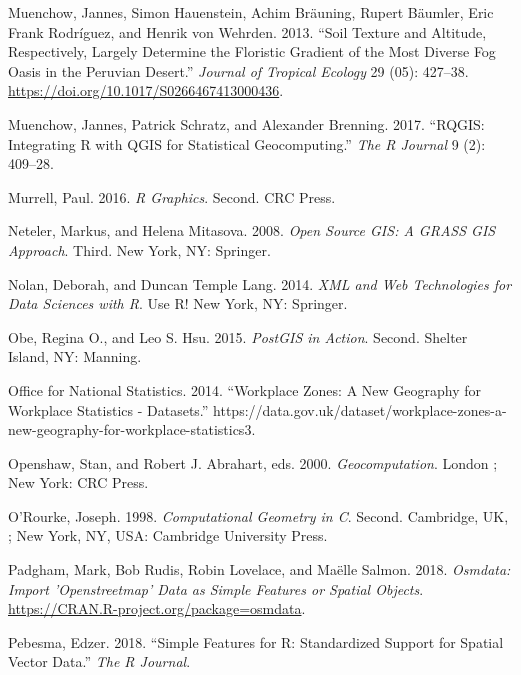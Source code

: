 \documentclass[]{krantz}
\begin{document}
\leavevmode\hypertarget{ref-muenchow_soil_2013}{}%
Muenchow, Jannes, Simon Hauenstein, Achim Bräuning, Rupert Bäumler, Eric Frank Rodríguez, and Henrik von Wehrden. 2013. ``Soil Texture and Altitude, Respectively, Largely Determine the Floristic Gradient of the Most Diverse Fog Oasis in the Peruvian Desert.'' \emph{Journal of Tropical Ecology} 29 (05): 427--38. \url{https://doi.org/10.1017/S0266467413000436}.

\leavevmode\hypertarget{ref-muenchow_rqgis:_2017}{}%
Muenchow, Jannes, Patrick Schratz, and Alexander Brenning. 2017. ``RQGIS: Integrating R with QGIS for Statistical Geocomputing.'' \emph{The R Journal} 9 (2): 409--28.

\leavevmode\hypertarget{ref-murrell_r_2016}{}%
Murrell, Paul. 2016. \emph{R Graphics}. Second. CRC Press.

\leavevmode\hypertarget{ref-neteler_open_2008}{}%
Neteler, Markus, and Helena Mitasova. 2008. \emph{Open Source GIS: A GRASS GIS Approach}. Third. New York, NY: Springer.

\leavevmode\hypertarget{ref-nolan_xml_2014}{}%
Nolan, Deborah, and Duncan Temple Lang. 2014. \emph{XML and Web Technologies for Data Sciences with R}. Use R! New York, NY: Springer.

\leavevmode\hypertarget{ref-obe_postgis_2015}{}%
Obe, Regina O., and Leo S. Hsu. 2015. \emph{PostGIS in Action}. Second. Shelter Island, NY: Manning.

\leavevmode\hypertarget{ref-office_for_national_statistics_workplace_2014}{}%
Office for National Statistics. 2014. ``Workplace Zones: A New Geography for Workplace Statistics - Datasets.'' https://data.gov.uk/dataset/workplace-zones-a-new-geography-for-workplace-statistics3.

\leavevmode\hypertarget{ref-openshaw_geocomputation_2000}{}%
Openshaw, Stan, and Robert J. Abrahart, eds. 2000. \emph{Geocomputation}. London ; New York: CRC Press.

\leavevmode\hypertarget{ref-orourke_computational_1998}{}%
O'Rourke, Joseph. 1998. \emph{Computational Geometry in C}. Second. Cambridge, UK, ; New York, NY, USA: Cambridge University Press.

\leavevmode\hypertarget{ref-R-osmdata}{}%
Padgham, Mark, Bob Rudis, Robin Lovelace, and Maëlle Salmon. 2018. \emph{Osmdata: Import 'Openstreetmap' Data as Simple Features or Spatial Objects}. \url{https://CRAN.R-project.org/package=osmdata}.

\leavevmode\hypertarget{ref-pebesma_simple_2018}{}%
Pebesma, Edzer. 2018. ``Simple Features for R: Standardized Support for Spatial Vector Data.'' \emph{The R Journal}.
\end{document}
